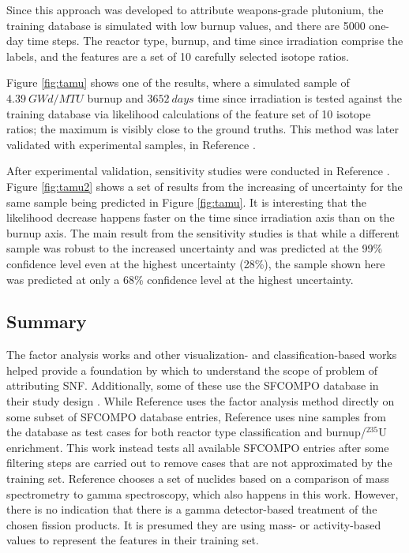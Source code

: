 Since this approach was developed to attribute weapons-grade plutonium, the
training database is simulated with low burnup values, and there are 5000
one-day time steps.  The reactor type, burnup, and time since irradiation
comprise the labels, and the features are a set of 10 carefully selected
isotope ratios. 

Figure \ref{fig:tamu} shows one of the results, where a simulated sample of
$4.39\:GWd/MTU$ burnup and $3652\:days$ time since irradiation is tested
against the training database via likelihood calculations of the feature set of
10 isotope ratios; the maximum is visibly close to the ground truths.  This
method was later validated with experimental samples, in Reference
\cite{mll_validate}. 

After experimental validation, sensitivity studies were conducted in Reference
\cite{mll_sensitivity}.  Figure \ref{fig:tamu2} shows a set of results from the
increasing of uncertainty for the same sample being predicted in Figure
\ref{fig:tamu}.  It is interesting that the likelihood decrease happens faster
on the time since irradiation axis than on the burnup axis. The main result
from the sensitivity studies is that while a different sample was robust to the
increased uncertainty and was predicted at the 99\% confidence level even at
the highest uncertainty (28\%), the sample shown here was predicted at only a
68\% confidence level at the highest uncertainty.

\subsection{Summary}

The factor analysis works \cite{nicolaou_2006, nicolaou_pu, nicolaou_2009,
nicolaou_2014, nicolaou_2015} and other visualization- and classification-based
works \cite{pu_discrimination, jones_snf_2014, jones_viz_2014} helped provide a
foundation by which to understand the scope of problem of attributing
\gls{SNF}. Additionally, some of these use the \gls{SFCOMPO} database in their
study design \cite{nicolaou_2014, jones_viz_2014}. While Reference
\cite{nicolaou_2014} uses the factor analysis method directly on some subset of
\gls{SFCOMPO} database entries, Reference \cite{jones_viz_2014} uses nine
samples from the database as test cases for both reactor type classification
and burnup/${}^{235}\text{U}$ enrichment.  This work instead tests all
available \gls{SFCOMPO} entries after some filtering steps are carried out to
remove cases that are not approximated by the training set.  Reference
\cite{nicolaou_2009} chooses a set of nuclides based on a comparison of mass
spectrometry to gamma spectroscopy, which also happens in this work. However,
there is no indication that there is a gamma detector-based treatment of the
chosen fission products. It is presumed they are using mass- or activity-based
values to represent the features in their training set. 

